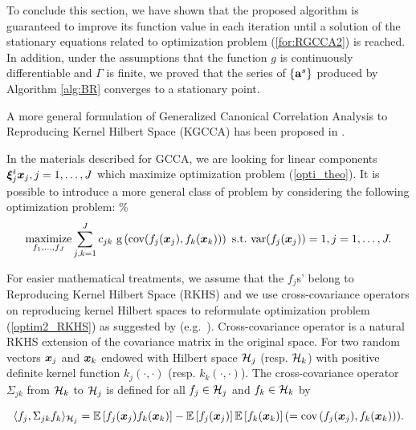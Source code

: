 \documentclass[
]{jss}
\begin{document}
To conclude this section, we have shown that the proposed algorithm is
guaranteed to improve its function value in each iteration until a
solution of the stationary equations related to optimization problem
(\ref{for:RGCCA2}) is reached. In addition, under the assumptions that
the function \(g\) is continuously differentiable and \(\Gamma\) is
finite, we proved that the series of \(\{\mathbf{a}^s\}\) produced by
Algorithm \ref{alg:BR} converges to a stationary point.

A more general formulation of Generalized Canonical Correlation Analysis
to Reproducing Kernel Hilbert Space (KGCCA) has been proposed in
\citep{Tenenhaus2015a}.

In the materials described for GCCA, we are looking for linear
components \(\boldsymbol{\xi}_j^t\boldsymbol{x}_j, j = 1, \ldots, J\) which maximize
optimization problem (\ref{opti_theo}). It is possible to introduce a
more general class of problem by considering the following optimization
problem: \% \begin{equation}
\underset{f_1, \ldots, f_J}{\text{maximize}}  \displaystyle \sum_{j, k =
1}^J c_{jk} \text{ g}
\left(\text{cov}(f_j(\boldsymbol{x}_j),f_k(\boldsymbol{x}_k))\right)\\\\ \mathrm{~s.t.~} \text{var}(f_j(\boldsymbol{x}_j))=1, j =1, \ldots, J.
\label{optim2_RKHS}
\end{equation}

For easier mathematical treatments, we assume that the \(f_j\)s' belong
to Reproducing Kernel Hilbert Space (RKHS) and we use cross-covariance
operators on reproducing kernel Hilbert spaces \citep{Baker1973} to
reformulate optimization problem (\ref{optim2_RKHS}) as suggested by
(e.g.~\citep{Fukumizu2004,Fukumizu2007}). Cross-covariance operator is a
natural RKHS extension of the covariance matrix in the original space.
For two random vectors \(\boldsymbol{x}_j\) and \(\boldsymbol{x}_k\) endowed with Hilbert
space \(\mathcal{H}_j\) (resp. \(\mathcal{H}_k\)) with positive definite kernel
function \(k_j(\cdot, \cdot)\) (resp. \(k_k(\cdot, \cdot)\)). The
cross-covariance operator \(\Sigma_{jk}\) from \(\mathcal{H}_k\) to \(\mathcal{H}_j\)
is defined for all \(f_j \in \mathcal{H}_j\) and \(f_k \in \mathcal{H}_k\) by

\begin{equation*} \langle f_j, \Sigma_{jk}f_k \rangle_{\mathcal{H}_j} =
\mathbb{E}\left[f_j(\boldsymbol{x}_j)f_k(\boldsymbol{x}_k)\right]
-\mathbb{E}\left[f_j(\boldsymbol{x}_j)\right] \mathbb{E}\left[f_k(\boldsymbol{x}_k)\right]
(=\text{cov}\left(f_j(\boldsymbol{x}_j), f_k(\boldsymbol{x}_k)\right)).
\end{equation*}
\end{document}
